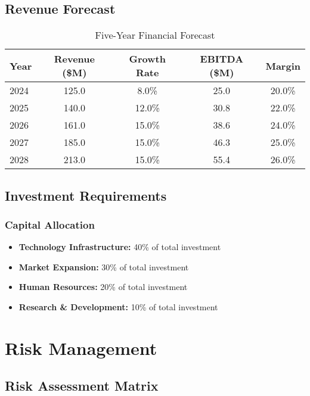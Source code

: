 \documentclass[11pt,a4paper]{article}
\begin{document}
\subsection{Revenue Forecast}

\begin{table}[h]
\centering
\begin{tabular}{@{}lcccc@{}}
\toprule
\textbf{Year} & \textbf{Revenue (\$M)} & \textbf{Growth Rate} & \textbf{EBITDA (\$M)} & \textbf{Margin} \\
\midrule
2024 & 125.0 & 8.0\% & 25.0 & 20.0\% \\
2025 & 140.0 & 12.0\% & 30.8 & 22.0\% \\
2026 & 161.0 & 15.0\% & 38.6 & 24.0\% \\
2027 & 185.0 & 15.0\% & 46.3 & 25.0\% \\
2028 & 213.0 & 15.0\% & 55.4 & 26.0\% \\
\bottomrule
\end{tabular}
\caption{Five-Year Financial Forecast}
\end{table}

\subsection{Investment Requirements}

\lipsum[28-29]

\subsubsection{Capital Allocation}
\begin{itemize}[leftmargin=*]
  \item \textbf{Technology Infrastructure:} 40\% of total investment
  \item \textbf{Market Expansion:} 30\% of total investment
  \item \textbf{Human Resources:} 20\% of total investment
  \item \textbf{Research \& Development:} 10\% of total investment
\end{itemize}

\section{Risk Management}

\subsection{Risk Assessment Matrix}
\end{document}
